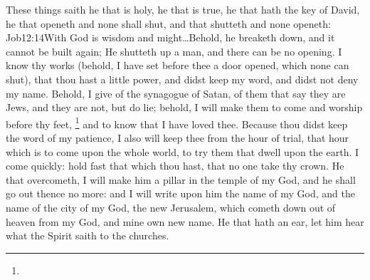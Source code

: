 These things saith he that is holy, he that is true, he that hath the key of David, he that openeth and none shall shut, and that shutteth and none openeth:%
				{Job}{12:14}{With God is wisdom and might\ldots Behold, he breaketh down, and it cannot be built again; He shutteth up a man, and there can be no opening.} %
I know thy works (behold, I have set before thee a door opened, which none can shut), that thou hast a little power, and didst keep my word, and didst not deny my name. %
 Behold, I give of the synagogue of Satan, of them that say they are Jews, and they are not, but do lie; behold, I will make them to come and worship before thy feet,%
	\footnote{ %
				} %
and to know that I have loved thee.%
Because thou didst keep the word of my patience, I also will keep thee from the hour of trial, that hour which is to come upon the whole world, to try them that dwell upon the earth. %
I come quickly: hold fast that which thou hast, that no one take thy crown. %
He that overcometh, I will make him a pillar in the temple of my God, and he shall go out thence no more: and I will write upon him the name of my God, and the name of the city of my God,%
 the new Jerusalem, which cometh down out of heaven from my God, and mine own new name. %
He that hath an ear, let him hear what the Spirit saith to the churches.

